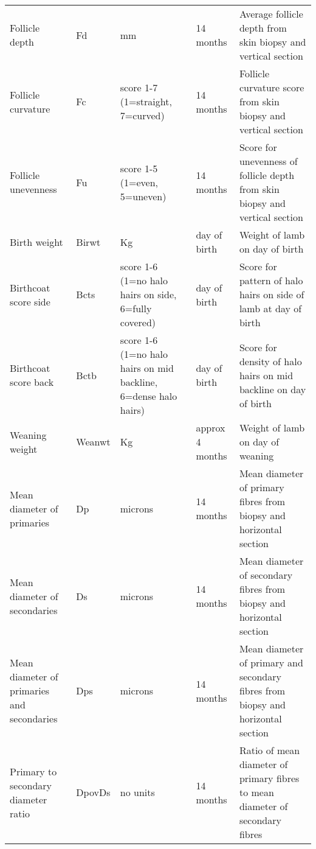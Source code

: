 \begin{center}
\begin{landscape}
\begin{longtable}{p{1.5in}|p{0.8in}|p{1.5in}|p{1.0in}|p{2.5in}}
  Follicle depth & Fd & mm & 14 months & Average follicle depth from skin biopsy and vertical section \\
  Follicle curvature & Fc & score 1-7 (1=straight, 7=curved) & 14 months & Follicle curvature score from skin biopsy and vertical section \\
  Follicle unevenness & Fu & score 1-5 (1=even, 5=uneven) & 14 months & Score for unevenness of follicle depth from skin biopsy and vertical section \\
  Birth weight & Birwt & Kg & day of birth & Weight of lamb on day of birth \\
  Birthcoat score side & Bcts & score 1-6 (1=no halo hairs on side, 6=fully covered) & day of birth & Score for pattern of halo hairs on side of lamb at day of birth \\
  Birthcoat score back & Bctb & score 1-6 (1=no halo hairs on mid backline, 6=dense halo hairs) & day of birth & Score for density of halo hairs on mid backline on day of birth \\
  Weaning weight & Weanwt & Kg & approx 4 months & Weight of lamb on day of weaning \\
  Mean diameter of primaries & Dp & microns & 14 months & Mean diameter of primary fibres from biopsy and horizontal section \\
  Mean diameter of secondaries & Ds & microns & 14 months & Mean diameter of secondary fibres from biopsy and horizontal section \\
  Mean diameter of primaries and secondaries & Dps & microns & 14 months & Mean diameter of primary and secondary fibres from biopsy and horizontal section \\
  Primary to secondary diameter ratio & DpovDs & no units & 14 months & Ratio of mean diameter of primary fibres to mean diameter of secondary fibres \\

\end{longtable}
\end{landscape}
\end{center}
%
